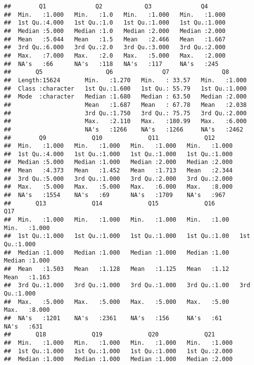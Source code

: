 \documentclass[
]{article}
\begin{document}
\begin{verbatim}
##        Q1              Q2            Q3              Q4       
##  Min.   :1.000   Min.   :1.0   Min.   :1.000   Min.   :1.000  
##  1st Qu.:4.000   1st Qu.:1.0   1st Qu.:1.000   1st Qu.:1.000  
##  Median :5.000   Median :1.0   Median :2.000   Median :2.000  
##  Mean   :5.044   Mean   :1.5   Mean   :2.466   Mean   :1.667  
##  3rd Qu.:6.000   3rd Qu.:2.0   3rd Qu.:3.000   3rd Qu.:2.000  
##  Max.   :7.000   Max.   :2.0   Max.   :5.000   Max.   :2.000  
##  NA's   :66      NA's   :118   NA's   :117     NA's   :245    
##       Q5                  Q6              Q7               Q8       
##  Length:15624       Min.   :1.270   Min.   : 33.57   Min.   :1.000  
##  Class :character   1st Qu.:1.600   1st Qu.: 55.79   1st Qu.:1.000  
##  Mode  :character   Median :1.680   Median : 63.50   Median :2.000  
##                     Mean   :1.687   Mean   : 67.78   Mean   :2.038  
##                     3rd Qu.:1.750   3rd Qu.: 75.75   3rd Qu.:2.000  
##                     Max.   :2.110   Max.   :180.99   Max.   :6.000  
##                     NA's   :1266    NA's   :1266     NA's   :2462   
##        Q9             Q10             Q11             Q12       
##  Min.   :1.000   Min.   :1.000   Min.   :1.000   Min.   :1.000  
##  1st Qu.:4.000   1st Qu.:1.000   1st Qu.:1.000   1st Qu.:1.000  
##  Median :5.000   Median :1.000   Median :2.000   Median :2.000  
##  Mean   :4.373   Mean   :1.452   Mean   :1.713   Mean   :2.344  
##  3rd Qu.:5.000   3rd Qu.:1.000   3rd Qu.:2.000   3rd Qu.:2.000  
##  Max.   :5.000   Max.   :5.000   Max.   :6.000   Max.   :8.000  
##  NA's   :1554    NA's   :69      NA's   :1709    NA's   :967    
##       Q13             Q14             Q15             Q16            Q17       
##  Min.   :1.000   Min.   :1.000   Min.   :1.000   Min.   :1.00   Min.   :1.000  
##  1st Qu.:1.000   1st Qu.:1.000   1st Qu.:1.000   1st Qu.:1.00   1st Qu.:1.000  
##  Median :1.000   Median :1.000   Median :1.000   Median :1.00   Median :1.000  
##  Mean   :1.503   Mean   :1.128   Mean   :1.125   Mean   :1.12   Mean   :1.163  
##  3rd Qu.:1.000   3rd Qu.:1.000   3rd Qu.:1.000   3rd Qu.:1.00   3rd Qu.:1.000  
##  Max.   :5.000   Max.   :5.000   Max.   :5.000   Max.   :5.00   Max.   :8.000  
##  NA's   :1201    NA's   :2361    NA's   :156     NA's   :61     NA's   :631    
##       Q18             Q19             Q20             Q21       
##  Min.   :1.000   Min.   :1.000   Min.   :1.000   Min.   :1.000  
##  1st Qu.:1.000   1st Qu.:1.000   1st Qu.:1.000   1st Qu.:2.000  
##  Median :1.000   Median :1.000   Median :1.000   Median :2.000  

\end{verbatim}
\end{document}
